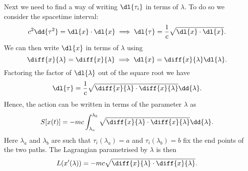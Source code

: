 Next we need to find a way of writing \(\dl{\tau_i}\) in terms of \(\lambda\).
To do so we consider the spacetime interval:
\begin{equation}
    c^2\dd{\tau^2} = \dl{x} \cdot \dl{x} \implies \dl{\tau} = \frac{1}{c}\sqrt{\dl{x}\cdot\dl{x}}.
\end{equation}
We can then write \(\dl{x}\) in terms of \(\lambda\) using
\begin{equation}
    \diff{x}{\lambda} = \diff{x}{\lambda} \implies \dl{x} = \diff{x}{\lambda}\dl{\lambda}.
\end{equation}
Factoring the factor of \(\dl{\lambda}\) out of the square root we have
\begin{equation}
    \dl{\tau} = \frac{1}{c}\sqrt{\diff{x}{\lambda} \cdot \diff{x}{\lambda}} \dd{\lambda}.
\end{equation}
Hence, the action can be written in terms of the parameter \(\lambda\) as
\begin{equation}\label{eqn:relativistic action in terms of lambda}
    S[x(t)] = -mc \int_{\lambda_a}^{\lambda_b} \sqrt{\diff{x}{\lambda} \cdot \diff{x}{\lambda}} \dd{\lambda}.
\end{equation}
Here \(\lambda_a\) and \(\lambda_b\) are such that \(\tau_i(\lambda_a) = a\) and \(\tau_i(\lambda_b) = b\) fix the end points of the two paths.
The Lagrangian parametrised by \(\lambda\) is then
\begin{equation}
    \lagrangian(x'(\lambda)) = -mc\sqrt{\diff{x}{\lambda}\cdot\diff{x}{\lambda}}.
\end{equation}


